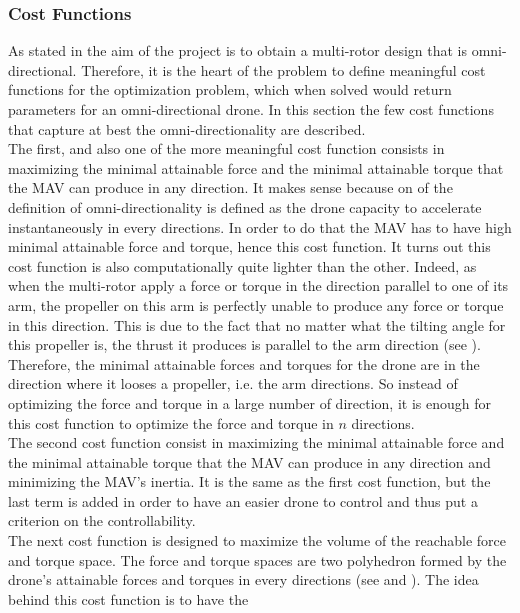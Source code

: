\subsubsection{Cost Functions}
\label{sec:cost_functions}
As stated in  the aim of the project is to obtain a multi-rotor
design that is omni-directional. Therefore, it is the heart of the problem to
define meaningful cost functions for the optimization problem, which when
solved would return parameters for an omni-directional drone. In this section
the few cost functions that capture at best the omni-directionality are described.\\
The first, and also one of the more meaningful cost function consists in maximizing
the minimal attainable force and the minimal attainable torque that the MAV can
produce in any direction. It makes sense because on of the definition of
omni-directionality  is defined as the drone capacity to accelerate instantaneously
in every directions. In order to do that the MAV has to have high minimal attainable
force and torque, hence this cost function. It turns out this cost function is also
computationally quite lighter than the other. Indeed, as when the multi-rotor apply a
force or torque in the direction parallel to one of its arm, the propeller on this arm
is perfectly unable to produce any force or torque in this direction. This is due to
the fact that no matter what the tilting angle for this propeller is, the thrust it
produces is parallel to the arm direction (see ). Therefore,
the minimal attainable forces and torques for the drone are in the direction where
it looses a propeller, i.e. the arm directions. So instead of optimizing the force
and torque in a large number of direction, it is enough for this cost function to
optimize the force and torque in $n$ directions.\\
The second cost function consist in maximizing the minimal attainable force
and the minimal attainable torque that the MAV can produce in any direction
and minimizing the MAV’s inertia. It is the same as the first cost function, but
the last term is added in order to have an easier drone to control and thus put
a criterion on the controllability.\\
The next cost function is designed to maximize the volume of the reachable
force and torque space. The force and torque spaces are two polyhedron formed
by the drone’s attainable forces and torques in every directions (see 
and ). The idea behind this cost function is to have the
